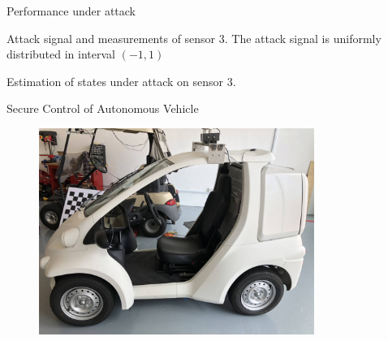 \documentclass[10pt]{beamer}
\begin{document}
\begin{frame}{Performance under attack}
  \vspace{-30pt}
  \begin{figure}[ht]
    \centering
    \scalebox{0.65}{}
  \end{figure}
  \vspace{-10pt}
  \small Attack signal and measurements of sensor 3. The attack signal is uniformly distributed in interval $(-1,1)$
  \vspace{-10pt}
  \begin{figure}[ht]
    \centering
    \scalebox{0.65}{}
  \end{figure}
  \vspace{-10pt}
  Estimation of states under attack on sensor 3.
\end{frame}


\begin{frame}{Secure Control of Autonomous Vehicle}
  \begin{figure}[ht]
    \centering
    \includegraphics[width=0.8\textwidth]{singpilot.jpg}
  \end{figure}

\end{frame}
\end{document}
